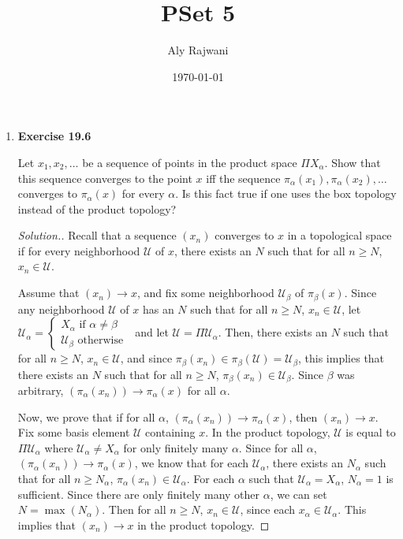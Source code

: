 \documentclass{article}
\title{PSet 5}
\author{Aly Rajwani}
\date{\today}
\newcommand{\U}{\mathcal{U}}
\newcommand{\sk}{\smallskip}
\begin{document}
\maketitle

\begin{enumerate}
    \item \textbf{Exercise 19.6}
    
    Let $x_1, x_2, \dots$ be a sequence of points in the product space $\Pi X_\alpha$. Show that this sequence converges to the point $x$ iff the sequence $\pi_\alpha(x_1), \pi_\alpha(x_2), \dots$ converges to $\pi_\alpha(x)$ for every $\alpha$. Is this fact true if one uses the box topology instead of the product topology?
    
    \begin{proof}[Solution.]
    Recall that a sequence $(x_n)$ converges to $x$ in a topological space if for every neighborhood $\U$ of $x$, there exists an $N$ such that for all $n \geq N$, $x_n \in \U$. 
    
    \sk
    
    Assume that $(x_n) \longrightarrow x$, and fix some neighborhood $\U_\beta$ of $\pi_\beta(x)$. Since any neighborhood $\U$ of $x$ has an $N$ such that for all $n \geq N$, $x_n \in \U$, let $\U_\alpha = \begin{cases}
        X_\alpha \text{ if } \alpha \neq \beta \\
        \U_\beta \text{ otherwise }
    \end{cases}$ and let $\U = \Pi \U_\alpha$. Then, there exists an $N$ such that for all $n \geq N$, $x_n \in \U$, and since $\pi_\beta(x_n) \in \pi_\beta(\U) = \U_\beta$, this implies that there exists an $N$ such that for all $n \geq N$, $\pi_\beta(x_n) \in \U_\beta$. Since $\beta$ was arbitrary, $(\pi_\alpha(x_n)) \longrightarrow \pi_\alpha(x)$ for all $\alpha$.

    \sk

    Now, we prove that if for all $\alpha$, $(\pi_\alpha(x_n)) \longrightarrow \pi_\alpha(x)$, then $(x_n) \longrightarrow x$. Fix some basis element $\U$ containing $x$. In the product topology, $\U$ is equal to $\Pi \U_\alpha$ where $\U_\alpha \neq X_\alpha$ for only finitely many $\alpha$. Since for all $\alpha$, $(\pi_\alpha(x_n)) \longrightarrow \pi_\alpha(x)$, we know that for each $\U_\alpha$, there exists an $N_\alpha$ such that for all $n \geq N_\alpha$, $\pi_\alpha(x_n) \in \U_\alpha$. For each $\alpha$ such that $\U_\alpha = X_\alpha$, $N_\alpha = 1$ is sufficient. Since there are only finitely many other $\alpha$, we can set $N = \max(N_\alpha)$. Then for all $n \geq N$, $x_n \in \U$, since each $x_\alpha \in \U_\alpha$. This implies that $(x_n) \longrightarrow x$ in the product topology.


\end{proof}
\end{enumerate}
\end{document}

